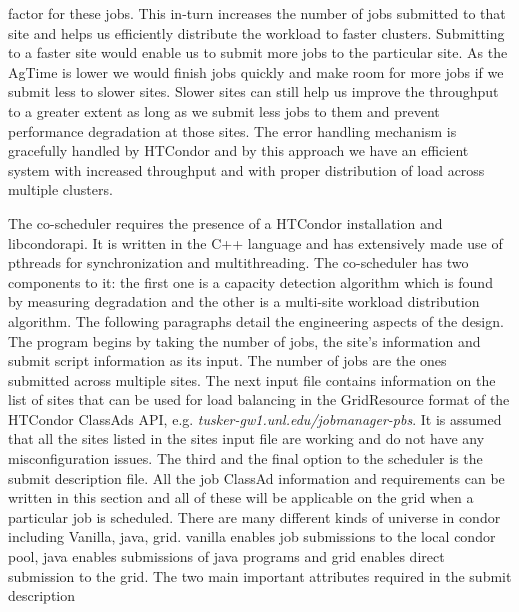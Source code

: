 \documentclass[ms,electronic,double]{nuthesis}
\begin{document}
 factor for these jobs. This in-turn increases the number of jobs submitted to that site and helps us efficiently distribute 
 the workload to faster clusters. Submitting to a faster site would enable us to submit 
 more jobs to the particular site. As the AgTime is lower we would finish jobs quickly and make room for more
 jobs if we submit less to slower sites. Slower sites can still help us improve the throughput to a greater extent as long as we submit less jobs to them and prevent performance degradation at those sites. The error handling mechanism is gracefully handled by 
 HTCondor and by this approach we have an efficient system with increased throughput and with proper distribution of load across multiple clusters.
 
The co-scheduler requires the presence of a HTCondor installation and libcondorapi.
It is written in the C++ language and has extensively made use of pthreads for 
synchronization and multithreading. The co-scheduler has two components to it: the first one is a capacity detection
algorithm which is found by measuring degradation and the other is a multi-site workload distribution algorithm. The following paragraphs detail the 
engineering aspects of the design. The program begins by taking the number of jobs, the site's information and submit script 
information as its input. The number of jobs are the ones submitted across 
multiple sites. The next input file contains information on the list of sites that can be used 
for load balancing in the GridResource format of the HTCondor ClassAds API, e.g. \emph{tusker-gw1.unl.edu/jobmanager-pbs}.
It is assumed that all the sites listed in the sites input file are working and 
do not have any misconfiguration issues. The third and the final option to the 
scheduler is the submit description file. All the job ClassAd information and 
requirements can be written in this section and all of these will be applicable on the grid when a particular job is 
scheduled. There are many different kinds of universe in condor including Vanilla, java, grid. vanilla enables job submissions to the local
condor pool, java enables submissions of java programs and grid enables direct submission to the grid. 
The two main important attributes required in the submit description 
\end{document}

